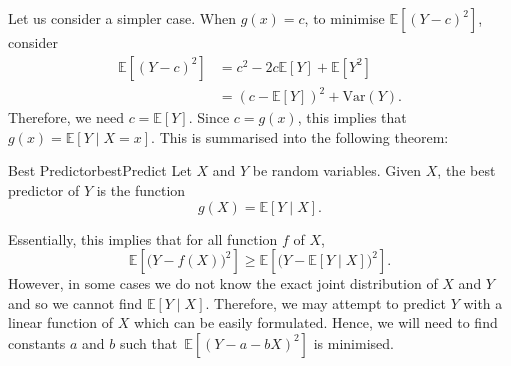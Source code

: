 \documentclass[math]{amznotes}
\theoremstyle{remark}
\newcommand{\0}{\mathbf{0}}
\newcommand{\1}{\mathbf{1}}
\begin{document}
Let us consider a simpler case. When $g(x) = c$, to minimise $\mathbb{E}\left[(Y - c)^2\right]$, consider
\begin{align*}
    \mathbb{E}\left[(Y - c)^2\right] & = c^2 - 2c\mathbb{E}[Y] + \mathbb{E}\left[Y^2\right] \\
    & = \left(c - \mathbb{E}[Y]\right)^2 + \mathrm{Var}(Y).
\end{align*}
Therefore, we need $c = \mathbb{E}[Y]$. Since $c = g(x)$, this implies that $g(x) = \mathbb{E}[Y \mid X = x]$. This is summarised into the following theorem:
\begin{thmbox}{Best Predictor}{bestPredict}
    Let $X$ and $Y$ be random variables. Given $X$, the best predictor of $Y$ is the function 
    \begin{equation*}
        g(X) = \mathbb{E}[Y \mid X].
    \end{equation*}
\end{thmbox}
Essentially, this implies that for all function $f$ of $X$, 
\begin{equation*}
    \mathbb{E}\left[\bigl(Y - f(X)\bigr)^2\right] \geq \mathbb{E}\left[\bigl(Y - \mathbb{E}[Y \mid X]\bigr)^2\right].
\end{equation*}
However, in some cases we do not know the exact joint distribution of $X$ and $Y$ and so we cannot find $\mathbb{E}[Y \mid X]$. Therefore, we may attempt to predict $Y$ with a linear function of $X$ which can be easily formulated. Hence, we will need to find constants $a$ and $b$ such that~$\mathbb{E}\left[(Y - a - bX)^2\right]$ is minimised.
\end{document}
